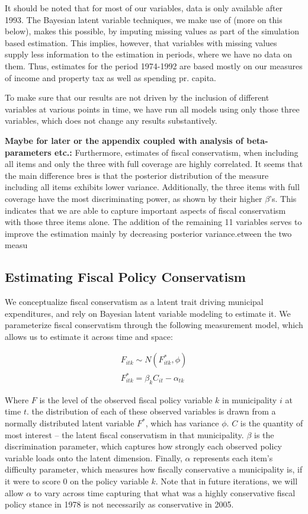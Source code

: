 \documentclass[a4paper,11pt]{article}
\begin{document}
It should be noted that for most of our variables, data is only available after 1993. The Bayesian latent variable techniques, we make use of (more on this below), makes this possible, by imputing missing values as part of the simulation based estimation. This implies, however, that variables with missing values supply less information to the estimation in periods, where we have no data on them. Thus, estimates for the period 1974-1992 are based mostly on our measures of income and property tax as well as spending pr. capita. 

To make sure that our results are not driven by the inclusion of different variables at various points in time, we have run all models using only those three variables, which does not change any results substantively. 

\textbf{Maybe for later or the appendix coupled with analysis of beta-parameters etc.:} Furthermore, estimates of fiscal conservatism, when including all items and only the three with full coverage are highly correlated. It seems that the main difference bres is that the posterior distribution of the measure including all items exhibits lower variance. Additionally, the three items with full coverage have the most discriminating power, as shown by their higher $\beta$'s. This indicates that we are able to capture important aspects of fiscal conservatism with those three items alone. The addition of the remaining 11 variables serves to improve the estimation mainly by decreasing posterior variance.etween the two measu

\subsection*{Estimating Fiscal Policy Conservatism}

We conceptualize fiscal conservatism as a latent trait driving municipal expenditures, and rely on Bayesian latent variable modeling to estimate it. We parameterize fiscal conservatism through the following measurement model, which allows us to estimate it across time and space:

\begin{gather*}
F_{itk} \sim N(F^*_{itk}, \phi)\\
F^*_{itk} = \beta_k C_{it} - \alpha_{tk}
\end{gather*}

\noindent Where $F$ is the level of the observed fiscal policy variable $k$ in municipality $i$ at time $t$. the distribution of each of these observed variables is drawn from a normally distributed latent variable $F^*$, which has variance $\phi$. $C$ is the quantity of most interest -- the latent fiscal conservatism in that municipality. $\beta$ is the discrimination parameter, which captures how strongly each observed policy variable loads onto the latent dimension. Finally, $\alpha$ represents each item's difficulty parameter, which measures how fiscally conservative a municipality is, if it were to score 0 on the policy variable $k$. Note that in future iterations, we will allow $\alpha$ to vary across time capturing that what was a highly conservative fiscal policy stance in 1978 is not necessarily as conservative in 2005.
\end{document}
